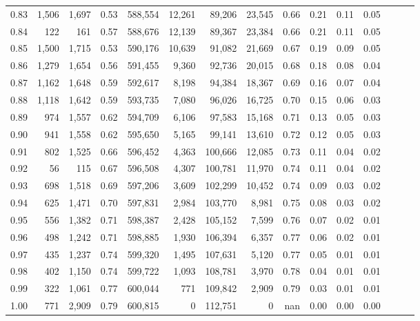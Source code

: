\begin{tabular}{rrrrrrrrrrrrrrr}
0.83 &   1,506 &  1,697 &  0.53 &  588,554 &   12,261 &   89,206 &   23,545 &  0.66 &  0.21 &  0.11 &      0.05 \\
0.84 &     122 &    161 &  0.57 &  588,676 &   12,139 &   89,367 &   23,384 &  0.66 &  0.21 &  0.11 &      0.05 \\
0.85 &   1,500 &  1,715 &  0.53 &  590,176 &   10,639 &   91,082 &   21,669 &  0.67 &  0.19 &  0.09 &      0.05 \\
0.86 &   1,279 &  1,654 &  0.56 &  591,455 &    9,360 &   92,736 &   20,015 &  0.68 &  0.18 &  0.08 &      0.04 \\
0.87 &   1,162 &  1,648 &  0.59 &  592,617 &    8,198 &   94,384 &   18,367 &  0.69 &  0.16 &  0.07 &      0.04 \\
0.88 &   1,118 &  1,642 &  0.59 &  593,735 &    7,080 &   96,026 &   16,725 &  0.70 &  0.15 &  0.06 &      0.03 \\
0.89 &     974 &  1,557 &  0.62 &  594,709 &    6,106 &   97,583 &   15,168 &  0.71 &  0.13 &  0.05 &      0.03 \\
0.90 &     941 &  1,558 &  0.62 &  595,650 &    5,165 &   99,141 &   13,610 &  0.72 &  0.12 &  0.05 &      0.03 \\
0.91 &     802 &  1,525 &  0.66 &  596,452 &    4,363 &  100,666 &   12,085 &  0.73 &  0.11 &  0.04 &      0.02 \\
0.92 &      56 &    115 &  0.67 &  596,508 &    4,307 &  100,781 &   11,970 &  0.74 &  0.11 &  0.04 &      0.02 \\
0.93 &     698 &  1,518 &  0.69 &  597,206 &    3,609 &  102,299 &   10,452 &  0.74 &  0.09 &  0.03 &      0.02 \\
0.94 &     625 &  1,471 &  0.70 &  597,831 &    2,984 &  103,770 &    8,981 &  0.75 &  0.08 &  0.03 &      0.02 \\
0.95 &     556 &  1,382 &  0.71 &  598,387 &    2,428 &  105,152 &    7,599 &  0.76 &  0.07 &  0.02 &      0.01 \\
0.96 &     498 &  1,242 &  0.71 &  598,885 &    1,930 &  106,394 &    6,357 &  0.77 &  0.06 &  0.02 &      0.01 \\
0.97 &     435 &  1,237 &  0.74 &  599,320 &    1,495 &  107,631 &    5,120 &  0.77 &  0.05 &  0.01 &      0.01 \\
0.98 &     402 &  1,150 &  0.74 &  599,722 &    1,093 &  108,781 &    3,970 &  0.78 &  0.04 &  0.01 &      0.01 \\
0.99 &     322 &  1,061 &  0.77 &  600,044 &      771 &  109,842 &    2,909 &  0.79 &  0.03 &  0.01 &      0.01 \\
1.00 &     771 &  2,909 &  0.79 &  600,815 &        0 &  112,751 &        0 &   nan &  0.00 &  0.00 &      0.00 \\
\bottomrule
\end{tabular}
